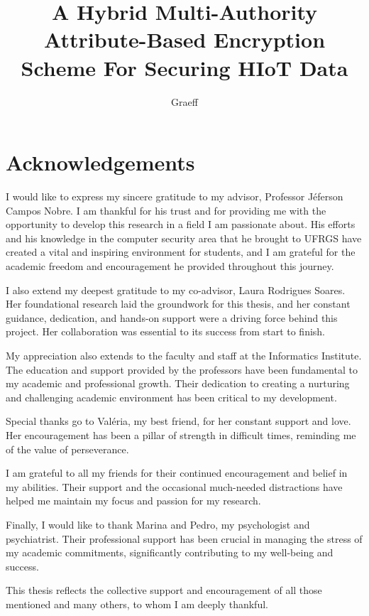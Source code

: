 \documentclass[cic,tc,english]{iiufrgs}
\title{
    A Hybrid Multi-Authority Attribute-Based Encryption Scheme For Securing HIoT Data
}
\author{Graeff}{Felipe de Almeida}
\numberwithin{algorithm}{chapter}
\begin{document}
\maketitle



\chapter*{Acknowledgements}
    I would like to express my sincere gratitude to my advisor, Professor Jéferson Campos Nobre. I am thankful for his trust and for providing me with the opportunity to develop this research in a field I am passionate about. His efforts and his knowledge in the computer security area that he brought to UFRGS have created a vital and inspiring environment for students, and I am grateful for the academic freedom and encouragement he provided throughout this journey.

    I also extend my deepest gratitude to my co-advisor, Laura Rodrigues Soares. Her foundational research laid the groundwork for this thesis, and her constant guidance, dedication, and hands-on support were a driving force behind this project. Her collaboration was essential to its success from start to finish.

    My appreciation also extends to the faculty and staff at the Informatics Institute. The education and support provided by the professors have been fundamental to my academic and professional growth. Their dedication to creating a nurturing and challenging academic environment has been critical to my development.

    Special thanks go to Valéria, my best friend, for her constant support and love. Her encouragement has been a pillar of strength in difficult times, reminding me of the value of perseverance.

    I am grateful to all my friends for their continued encouragement and belief in my abilities. Their support and the occasional much-needed distractions have helped me maintain my focus and passion for my research.

    Finally, I would like to thank Marina and Pedro, my psychologist and psychiatrist. Their professional support has been crucial in managing the stress of my academic commitments, significantly contributing to my well-being and success.

    This thesis reflects the collective support and encouragement of all those mentioned and many others, to whom I am deeply thankful.
\end{document}

